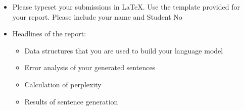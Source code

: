 \documentclass[a4 paper]{article}
\begin{document}

\begin{itemize}
    \item Please typeset your submissions in \LaTeX. Use the template provided for your report. Please include your name and Student No
    \item Headlines of the report: 
    \begin{itemize}
    \item Data structures that you are used to build your language model
    \item Error analysis of your generated sentences
    \item Calculation of perplexity
    \item Results of sentence generation
    \end{itemize}
\end{itemize}
\end{document}
